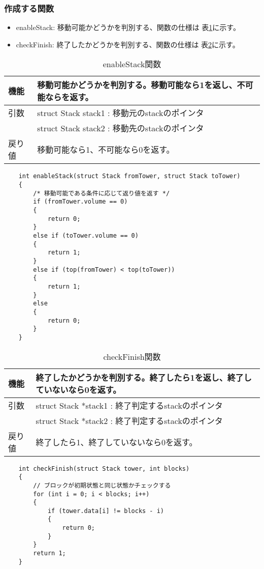 \documentclass[dvipdfmx]{jsarticle}
\begin{document}
\subsubsection{作成する関数}
\begin{itemize}
  \item enableStack: 移動可能かどうかを判別する、関数の仕様は 表\ref{tab:enablestack_func}に示す。
  \item checkFinish: 終了したかどうかを判別する、関数の仕様は 表\ref{tab:checkfinish_func}に示す。
\end{itemize}
\begin{table}[ht]
  \centering
  \begin{tabular}{|p{5cm}|p{10cm}|}
    \hline
    機能  & 移動可能かどうかを判別する。移動可能なら1を返し、不可能ならを返す。   \\
    \hline
    引数  & struct Stack stack1 : 移動元のstackのポインタ \\
        & struct Stack stack2 : 移動先のstackのポインタ \\
    \hline
    戻り値 & 移動可能なら1、不可能なら0を返す。                   \\
  \end{tabular}
  \begin{lstlisting}
    int enableStack(struct Stack fromTower, struct Stack toTower)
    {
        /* 移動可能である条件に応じて返り値を返す */
        if (fromTower.volume == 0)
        {
            return 0;
        }
        else if (toTower.volume == 0)
        {
            return 1;
        }
        else if (top(fromTower) < top(toTower))
        {
            return 1;
        }
        else
        {
            return 0;
        }
    }
  \end{lstlisting}
  \caption{enableStack関数}
  \label{tab:enablestack_func}
\end{table}
\begin{table}[ht]
  \centering
  \begin{tabular}{|p{5cm}|p{10cm}|}
    \hline
    機能  & 終了したかどうかを判別する。終了したら1を返し、終了していないなら0を返す。  \\
    \hline
    引数  & struct Stack *stack1 : 終了判定するstackのポインタ \\
        & struct Stack *stack2 : 終了判定するstackのポインタ \\
    \hline
    戻り値 & 終了したら1、終了していないなら0を返す。                   \\
  \end{tabular}
  \begin{lstlisting}
    int checkFinish(struct Stack tower, int blocks)
    {
        // ブロックが初期状態と同じ状態かチェックする
        for (int i = 0; i < blocks; i++)
        {
            if (tower.data[i] != blocks - i)
            {
                return 0;
            }
        }
        return 1;
    }
  \end{lstlisting}
  \caption{checkFinish関数}
  \label{tab:checkfinish_func}
\end{table}
\end{document}
